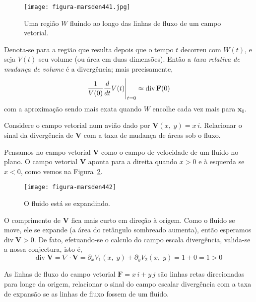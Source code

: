 \begin{figure}[H]
	\centering
	\texttt{[image: figura-marsden441.jpg]}
	\caption{ Uma região \(W\) fluindo ao longo das linhas de fluxo de um campo vetorial.}
	\label{fig:4-4-1}
\end{figure}

Denota-se para a região que resulta depois que o tempo \(t\) decorreu com \(W (t)\), e seja \(V(t)\)  seu volume (ou área em duas
dimensões). Então a \textit{taxa relativa de mudança de volume} é a divergência; mais precisamente,
\begin{equation*}
	\dfrac{1}{V(0)}\dfrac{d}{dt}V(t)\Bigg{\vert}_{t=0}\approx \mathrm{div\,}\mathbf{F}(0)
\end{equation*}
com a aproximação sendo mais exata quando \(W\) encolhe cada vez mais para \(\mathbf{x}_{0}\).

\begin{exc}
	Considere o campo vetorial num avião dado por \(\mathbf{V}(x,\; y) = x\, i\). Relacionar o sinal da divergência de \(\mathbf{V}\) com a taxa de mudança de
	áreas sob o fluxo.
\end{exc}

\solo Pensamos no campo vetorial \(\mathbf{V}\)  como o campo de velocidade de um fluido no plano. O campo vetorial \(\mathbf{V}\) aponta para a
direita quando \(x>0\) e à esquerda se \(x<0\), como vemos na Figura~\ref{fig:4-4-2}.

\begin{figure}[H]
	\centering
	\texttt{[image: figura-marsden442]}
	\caption{O fluido está se expandindo.}
	\label{fig:4-4-2}
\end{figure}

O comprimento de \(\mathbf{V}\) fica mais curto em direção à origem. Como o fluido se move, ele se expande (a área do retângulo sombreado
aumenta), então esperamos \(\mathrm{div}\; \mathbf{V} > 0\). De fato, efetuando-se o calculo do campo escala divergência, valida-se a nossa conjectura,
isto é,
\begin{equation*}
	\mathrm{div}\; \mathbf{V} =\nabla\cdot \mathbf{V} = \partial_{x}V_{1}(x,\; y)+\partial_{y}V_{2}(x,\; y)=1+0=1 > 0
\end{equation*}

\begin{exc}
	As linhas de fluxo do campo vetorial \(\mathbf{F} = x\, i + y\, j\) são linhas retas direcionadas para longe da origem, relacionar o sinal do
	campo escalar divergência  com a taxa de expansão se as linhas de fluxo fossem de um fluído.
\end{exc}

